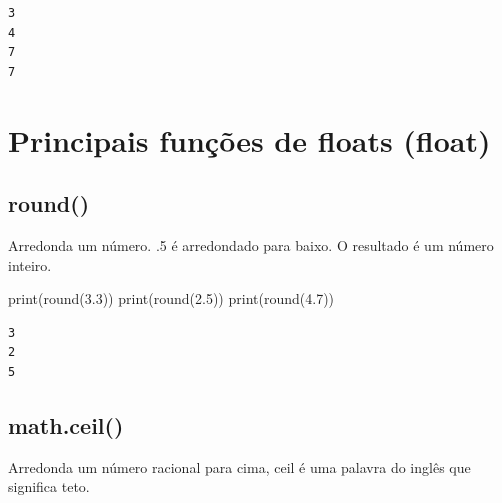 \documentclass[
  letterpaper,
  DIV=11,
  numbers=noendperiod]{scrreprt}
\newenvironment{Shaded}{\begin{snugshade}}{\end{snugshade}}
\newcommand{\BuiltInTok}[1]{\textcolor[rgb]{0.00,0.23,0.31}{#1}}
\newcommand{\FloatTok}[1]{\textcolor[rgb]{0.68,0.00,0.00}{#1}}
\newcommand{\NormalTok}[1]{\textcolor[rgb]{0.00,0.23,0.31}{#1}}
\begin{document}
\begin{tcolorbox}[enhanced jigsaw, breakable, leftrule=.75mm, left=2mm, opacityback=0, bottomrule=.15mm, toprule=.15mm, rightrule=.15mm, arc=.35mm, colback=white]

\begin{verbatim}
3
4
7
7
\end{verbatim}

\end{tcolorbox}

\hypertarget{principais-funuxe7uxf5es-de-floats-float}{%
\section{Principais funções de floats
(float)}\label{principais-funuxe7uxf5es-de-floats-float}}

\hypertarget{round}{%
\subsection{round()}\label{round}}

Arredonda um número. .5 é arredondado para baixo. O resultado é um
número inteiro.

\begin{Shaded}
\begin{Highlighting}[]
\BuiltInTok{print}\NormalTok{(}\BuiltInTok{round}\NormalTok{(}\FloatTok{3.3}\NormalTok{))}
\BuiltInTok{print}\NormalTok{(}\BuiltInTok{round}\NormalTok{(}\FloatTok{2.5}\NormalTok{))}
\BuiltInTok{print}\NormalTok{(}\BuiltInTok{round}\NormalTok{(}\FloatTok{4.7}\NormalTok{))}
\end{Highlighting}
\end{Shaded}

\begin{tcolorbox}[enhanced jigsaw, breakable, leftrule=.75mm, left=2mm, opacityback=0, bottomrule=.15mm, toprule=.15mm, rightrule=.15mm, arc=.35mm, colback=white]

\begin{verbatim}
3
2
5
\end{verbatim}

\end{tcolorbox}

\hypertarget{math.ceil}{%
\subsection{math.ceil()}\label{math.ceil}}

Arredonda um número racional para cima, ceil é uma palavra do inglês que
significa teto.
\end{document}
